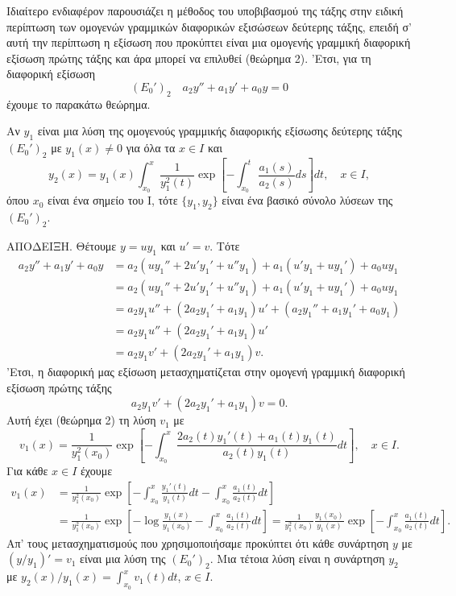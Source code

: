 \documentclass[11pt,a4paper,twoside]{book}
\newcommand{\titlefont}[1]{{\fontfamily{maksf}\selectfont #1}}
\newcounter{thewrhma}[chapter]
\renewcommand{\thethewrhma}{\thechapter.\arabic{thewrhma}}
\newcommand{\thewr}{\refstepcounter{thewrhma}{\bf\titlefont{\textcolor{secondarycolor}{\large Θεώρημα\hspace{2mm}\thethewrhma}}}\hspace{1mm}}{}
\newenvironment{Thewrhma}[1]
{\begin{tcolorbox}[title=\thewr\ \ :\ \  {\textcolor{black}{\bf{\large\titlefont{#1}}}},
breakable,
enhanced standard,
titlerule=-.2pt,
toprule=0pt, 
rightrule=0pt, 
bottomrule=0pt,
colback=white,
left=2mm,
top=1mm,
bottom=0mm,
boxrule=0pt,
colframe=white,
borderline west={1.5mm}{0pt}{secondarycolor},
leftrule=2mm,
sharp corners,
coltitle=secondarycolor]}
{\end{tcolorbox}}
\begin{document}
Ιδιαίτερο ενδιαφέρον παρουσιάζει η μέθοδος του υποβιβασμού της τάξης στην ειδική περίπτωση των ομογενών γραμμικών διαφορικών εξισώσεων δεύτερης τάξης, επειδή σ' αυτή την περίπτωση η εξίσωση που προκύπτει είναι μια ομογενής γραμμική διαφορική εξίσωση πρώτης τάξης και άρα μπορεί να επιλυθεί (θεώρημα 2). 'Ετσι, για τη διαφορική εξίσωση
\[
    (E_0')_2 \quad a_2 y'' + a_1 y' + a_0 y = 0
\]
έχουμε το παρακάτω θεώρημα.

\begin{Thewrhma}{10}
Αν $y_1$ είναι μια λύση της ομογενούς γραμμικής διαφορικής εξίσωσης δεύτερης τάξης $(E_0')_2$ με $y_1(x) \ne 0$ για όλα τα $x \in I$ και
\[
    y_2(x) = y_1(x) \int_{x_0}^x \frac{1}{y_1^2(t)} \exp \left[ -\int_{x_0}^t \frac{a_1(s)}{a_2(s)} ds \right] dt, \quad x \in I,
\]
όπου $x_0$ είναι ένα σημείο του Ι, τότε $\{y_1, y_2\}$ είναι ένα βασικό σύνολο λύσεων της $(E_0')_2$.
\end{Thewrhma}

\textsc{ΑΠΟΔΕΙΞΗ.} Θέτουμε $y=uy_1$ και $u'=v$. Τότε
\begin{align*}
    a_2 y'' + a_1 y' + a_0 y &= a_2 (u y_1'' + 2u'y_1' + u''y_1) + a_1(u'y_1+uy_1') + a_0 u y_1 \\
    &= a_2(u y_1'' + 2u'y_1' + u''y_1) + a_1(u'y_1+uy_1') + a_0 u y_1 \\
    &= a_2 y_1 u'' + (2a_2 y_1' + a_1 y_1) u' + (a_2 y_1'' + a_1 y_1' + a_0 y_1) \\
    &= a_2 y_1 u'' + (2a_2 y_1' + a_1 y_1) u' \\
    &= a_2 y_1 v' + (2a_2 y_1' + a_1 y_1) v.
\end{align*}
'Ετσι, η διαφορική μας εξίσωση μετασχηματίζεται στην ομογενή γραμμική διαφορική εξίσωση πρώτης τάξης
\[
    a_2 y_1 v' + (2a_2 y_1' + a_1 y_1) v = 0.
\]
Αυτή έχει (θεώρημα 2) τη λύση $v_1$ με
\[
    v_1(x) = \frac{1}{y_1^2(x_0)} \exp \left[ -\int_{x_0}^x \frac{2a_2(t)y_1'(t) + a_1(t)y_1(t)}{a_2(t)y_1(t)} dt \right], \quad x \in I.
\]
Για κάθε $x \in I$ έχουμε
\begin{align*}
    v_1(x) &= \frac{1}{y_1^2(x_0)} \exp \left[ -\int_{x_0}^x \frac{y_1'(t)}{y_1(t)} dt - \int_{x_0}^x \frac{a_1(t)}{a_2(t)} dt \right] \\
    &= \frac{1}{y_1^2(x_0)} \exp \left[ -\log\frac{y_1(x)}{y_1(x_0)} - \int_{x_0}^x \frac{a_1(t)}{a_2(t)} dt \right] = \frac{1}{y_1^2(x_0)} \frac{y_1(x_0)}{y_1(x)} \exp \left[ -\int_{x_0}^x \frac{a_1(t)}{a_2(t)} dt \right].
\end{align*}
Απ' τους μετασχηματισμούς που χρησιμοποιήσαμε προκύπτει ότι κάθε συνάρτηση $y$ με $(y/y_1)'=v_1$ είναι μια λύση της $(E_0')_2$. Μια τέτοια λύση είναι η συνάρτηση $y_2$ με $y_2(x)/y_1(x) = \int_{x_0}^x v_1(t) dt$, $x \in I$.
\end{document}
